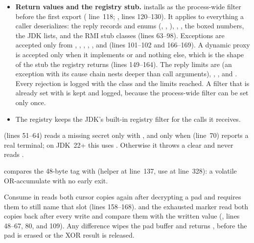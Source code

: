 \documentclass[11pt,a4paper]{article}
\begin{document}
\begin{description}[style=nextline,leftmargin=1.2em]
\begin{itemize}
\item \textbf{Return values and the registry stub.}  installs  as the process-wide filter before the first export ( line~118; ,  lines 120--130). It applies to everything a caller deserializes: the reply records and enums (, , ), , , the boxed numbers, the JDK lists, and the RMI stub classes (lines 63--98). Exceptions are accepted only from , , , , , and  (lines 101--102 and 166--169). A dynamic proxy is accepted only when it implements  or  and nothing else, which is the shape of the stub the registry returns (lines 149--164). The reply limits are  (an exception with its cause chain nests deeper than call arguments), , , and . Every rejection is logged with the class and the limits reached. A filter that is already set with  is kept and logged, because the process-wide filter can be set only once.
\item The registry keeps the JDK's built-in registry filter for the calls it receives.
\end{itemize}
\item[C-5 Secret prompt]\label{c:C-5}  (lines 51--64) reads a missing secret only with , and only when  (line~70) reports a real terminal; on JDK~22+ this uses . Otherwise it throws a clear  and never reads .
\item[C-6 Constant-time PIN tag check (firmware)]\label{c:C-6}  compares the 48-byte tag with  (helper at line~137, use at line~328): a volatile OR-accumulate with no early exit.
\item[C-7 OTP cursor re-read and verify-after-write (firmware)]\label{c:C-7} Consume in  reads both cursor copies again after decrypting a pad and requires them to still name that slot (lines 158--168).  and the exhausted marker read both copies back after every write and compare them with the written value (,  lines 48--67, 80, and 109). Any difference wipes the pad buffer and returns , before the pad is erased or the XOR result is released.

\end{description}
\end{document}
